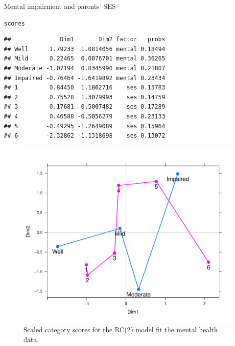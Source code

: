 \documentclass[11pt]{book}\usepackage[]{graphicx}\usepackage[]{color}
\makeatletter
\newcommand{\hlstd}[1]{\textcolor[rgb]{0.345,0.345,0.345}{#1}}%
\newenvironment{kframe}{%
 \def\at@end@of@kframe{}%
 \ifinner\ifhmode%
  \def\at@end@of@kframe{\end{minipage}}%
  \begin{minipage}{\columnwidth}%
 \fi\fi%
 \def\FrameCommand##1{\hskip\@totalleftmargin \hskip-\fboxsep
 \colorbox{shadecolor}{##1}\hskip-\fboxsep
     \hskip-\linewidth \hskip-\@totalleftmargin \hskip\columnwidth}%
 \MakeFramed {\advance\hsize-\width
   \@totalleftmargin\z@ \linewidth\hsize
   \@setminipage}}%
 {\par\unskip\endMakeFramed%
 \at@end@of@kframe}
\newenvironment{knitrout}{}{} %
\renewenvironment{knitrout}{\small\renewcommand{\baselinestretch}{.85}}{} %
\makeatother
\begin{document}
\begin{Example}[mental5]{Mental impairment and parents' SES}
\begin{knitrout}
\begin{kframe}
\begin{alltt}
\hlstd{scores}
\end{alltt}
\begin{verbatim}
##              Dim1       Dim2 factor   probs
## Well      1.79233  1.0814056 mental 0.18494
## Mild      0.22465  0.0076701 mental 0.36265
## Moderate -1.07194  0.8345990 mental 0.21807
## Impaired -0.76464 -1.6419892 mental 0.23434
## 1         0.84450  1.1862716    ses 0.15783
## 2         0.75528  1.3079993    ses 0.14759
## 3         0.17681  0.5007482    ses 0.17289
## 4         0.46588 -0.5056279    ses 0.23133
## 5        -0.49295 -1.2649089    ses 0.15964
## 6        -2.32862 -1.1318698    ses 0.13072
\end{verbatim}
\end{kframe}
\end{knitrout}
\begin{figure}[!htb]
\centering
\includegraphics[width=.7\textwidth]{ch08/fig/mental-RC2}
\caption{Scaled category scores for the RC(2) model fit
the mental health data.}
\label{fig:mental-RC2}
\end{figure}


\end{Example}
\end{document}
